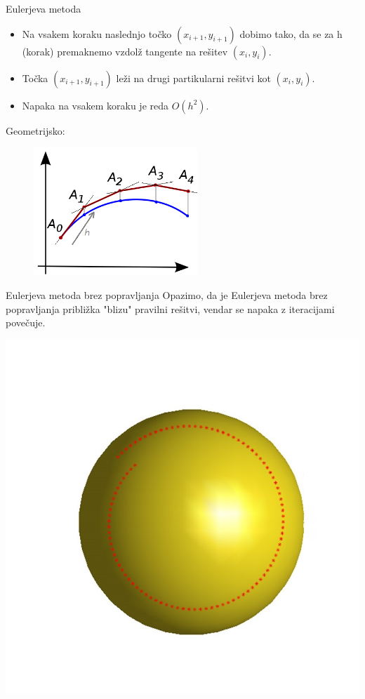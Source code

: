 \documentclass{beamer}
\begin{document}
\begin{frame}{Eulerjeva metoda}
 \begin{itemize}
    \item Na vsakem koraku naslednjo točko $(x_{i+1},y_{i+1})$ dobimo tako, da se za h (korak) premaknemo vzdolž tangente na rešitev $(x_{i},y_{i})$. 
    \item Točka $(x_{i+1},y_{i+1})$ leži na drugi partikularni rešitvi kot $(x_{i},y_{i})$.
    \item Napaka na vsakem koraku je reda $O(h^2)$.
 \end{itemize}
	\begin{block}{Geometrijsko:}
    	\begin{figure}
	    \centering
    	\includegraphics[width=0.55\textwidth]{Euler_method_geom}
\end{figure}
    \end{block}
\end{frame}

\begin{frame}{Eulerjeva metoda brez popravljanja}
	Opazimo, da je Eulerjeva metoda brez popravljanja približka "blizu" pravilni rešitvi, vendar se napaka z iteracijami povečuje. \\
	\begin{center}
		\includegraphics[scale=0.30]{eul1}
	\end{center}
\end{frame}
\end{document}
